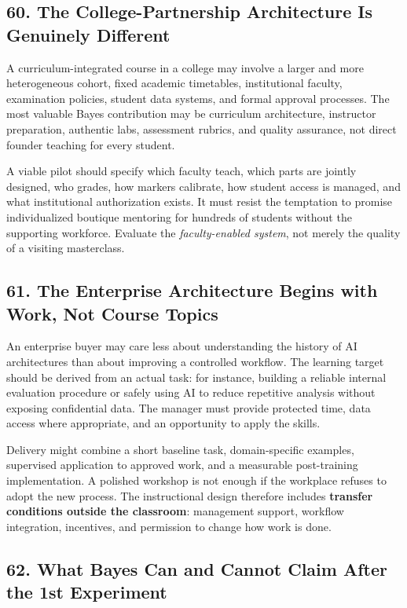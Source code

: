 \subsection*{60. The College-Partnership Architecture Is Genuinely Different}

A curriculum-integrated course in a college may involve a larger and more heterogeneous cohort, fixed academic timetables, institutional faculty, examination policies, student data systems, and formal approval processes. The most valuable Bayes contribution may be curriculum architecture, instructor preparation, authentic labs, assessment rubrics, and quality assurance, not direct founder teaching for every student.

A viable pilot should specify which faculty teach, which parts are jointly designed, who grades, how markers calibrate, how student access is managed, and what institutional authorization exists. It must resist the temptation to promise individualized boutique mentoring for hundreds of students without the supporting workforce. Evaluate the \emph{faculty-enabled system}, not merely the quality of a visiting masterclass.

\subsection*{61. The Enterprise Architecture Begins with Work, Not Course Topics}

An enterprise buyer may care less about understanding the history of AI architectures than about improving a controlled workflow. The learning target should be derived from an actual task: for instance, building a reliable internal evaluation procedure or safely using AI to reduce repetitive analysis without exposing confidential data. The manager must provide protected time, data access where appropriate, and an opportunity to apply the skills.

Delivery might combine a short baseline task, domain-specific examples, supervised application to approved work, and a measurable post-training implementation. A polished workshop is not enough if the workplace refuses to adopt the new process. The instructional design therefore includes \textbf{transfer conditions outside the classroom}: management support, workflow integration, incentives, and permission to change how work is done.

\subsection*{62. What Bayes Can and Cannot Claim After the 1st Experiment}

